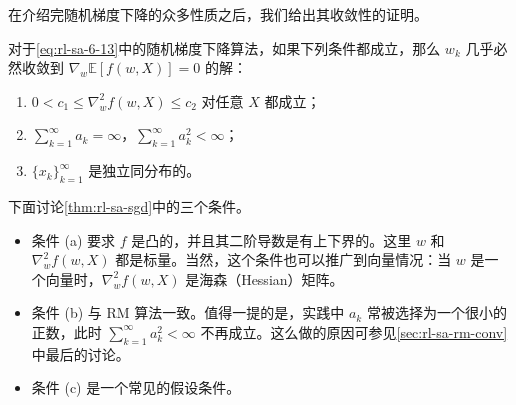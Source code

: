 在介绍完随机梯度下降的众多性质之后，我们给出其收敛性的证明。

\begin{theorem}[随机梯度下降的收敛性]\label{thm:rl-sa-sgd}
对于\eqref{eq:rl-sa-6-13}中的随机梯度下降算法，如果下列条件都成立，那么 $w_k$ 几乎必然收敛到 $\nabla_w \mathbb{E}[f(w, X)] = 0$ 的解：
\begin{enumerate}
  \item[(a)] $0 < c_1 \leqslant \nabla_w^2 f(w, X) \leqslant c_2$ 对任意 $X$ 都成立；
  \item[(b)] $\sum_{k=1}^{\infty} a_k = \infty$，$\sum_{k=1}^{\infty} a_k^2 < \infty$；
  \item[(c)] $\{x_k\}_{k=1}^{\infty}$ 是独立同分布的。
\end{enumerate}
\end{theorem}

下面讨论\cref{thm:rl-sa-sgd}中的三个条件。

\begin{itemize}
  \item 条件 (a) 要求 $f$ 是凸的，并且其二阶导数是有上下界的。这里 $w$ 和 $\nabla_w^2 f(w, X)$ 都是标量。当然，这个条件也可以推广到向量情况：当 $w$ 是一个向量时，$\nabla_w^2 f(w, X)$ 是海森（Hessian）矩阵。

  \item 条件 (b) 与 RM 算法一致。值得一提的是，实践中 $a_k$ 常被选择为一个很小的正数，此时 $\sum_{k=1}^{\infty} a_k^2 < \infty$ 不再成立。这么做的原因可参见\cref{sec:rl-sa-rm-conv}中最后的讨论。

  \item 条件 (c) 是一个常见的假设条件。
\end{itemize}

